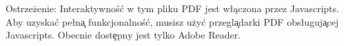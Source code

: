 Ostrze\. zenie: Interaktywno\'s\'c w tym pliku PDF jest w\l ączona przez Javascripts. 
Aby uzyska\'c pe\l n\c{a} funkcjonalno\'s\'c, musisz u\. zy\' c przegl\c{a}darki PDF obs\l uguj\c{a}cej Javascripts. 
Obecnie dost\c{e}pny jest tylko Adobe Reader.
